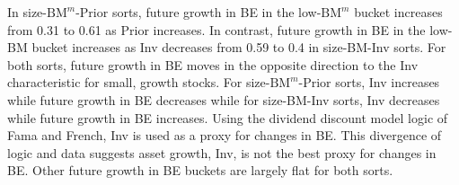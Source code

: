 In size-$\text{BM}^m$-Prior sorts, future growth in BE in the low-$\text{BM}^m$
bucket increases from 0.31 to 0.61 as Prior increases. In contrast, future
growth in BE in the low-BM bucket increases as Inv decreases from 0.59 to 0.4
in size-BM-Inv sorts. For both sorts, future growth in BE moves in the opposite
direction to the Inv characteristic for small, growth stocks.
For size-$\text{BM}^m$-Prior sorts, Inv
increases while future growth in BE decreases while for size-BM-Inv sorts, Inv
decreases while future growth in BE increases. Using the dividend discount
model logic of Fama and French, Inv is used as a proxy for changes in BE. This
divergence of logic and data suggests asset growth, Inv, is not the best proxy
for changes in BE.
Other future growth in BE buckets are largely flat for both sorts.

